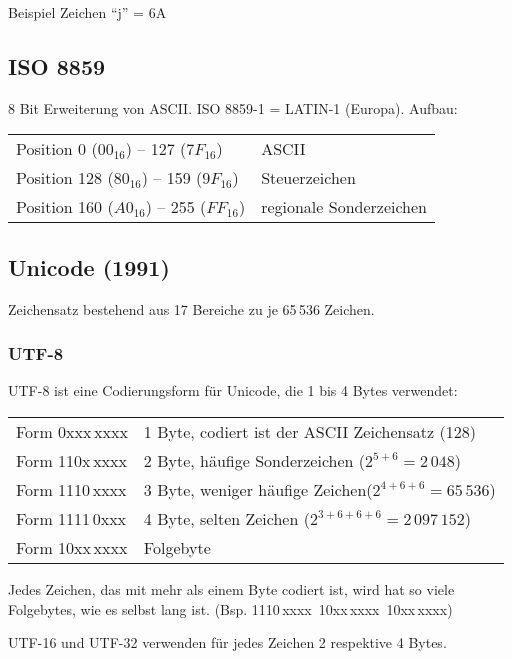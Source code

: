 Beispiel Zeichen \enquote{j} = 6A

\subsection{ISO 8859}
8 Bit Erweiterung von ASCII. ISO 8859-1 = LATIN-1 (Europa). Aufbau:
\begin{tabular}{@{}p{\the\MyLenA}%
				@{}p{\linewidth-\the\MyLenA}}
	Position 0 ($00_{16}$) -- 127 ($7F_{16}$) & ASCII\\
	Position 128 ($80_{16}$) -- 159 ($9F_{16}$) & Steuerzeichen\\
	Position 160 ($A0_{16}$) -- 255 ($FF_{16}$) & regionale Sonderzeichen\\
\end{tabular}

\subsection{Unicode (1991)}
Zeichensatz bestehend aus 17 Bereiche zu je 65\,536 Zeichen.

\subsubsection{UTF-8}
UTF-8 ist eine Codierungsform für Unicode, die 1 bis 4 Bytes verwendet:
\settowidth{\MyLenA}{Form 0xxx\,xxxx~~}
\begin{tabular}{@{}p{\the\MyLenA}%
				@{}p{\linewidth-\the\MyLenA}}
	Form 0xxx\,xxxx & 1 Byte, codiert ist der ASCII Zeichensatz (128)\\
	Form 110x\,xxxx & 2 Byte, häufige Sonderzeichen ($2^{5+6} = 2\,048$)\\
	Form 1110\,xxxx & 3 Byte, weniger häufige Zeichen($2^{4+6+6} = 65\,536$)\\
	Form 1111\,0xxx & 4 Byte, selten Zeichen ($2^{3+6+6+6} = 2\,097\,152$)\\
	Form 10xx\,xxxx & Folgebyte\\
\end{tabular}
Jedes Zeichen, das mit mehr als einem Byte codiert ist, wird hat so viele Folgebytes, wie es selbst lang ist. (Bsp. 1110\,xxxx~10xx\,xxxx~10xx\,xxxx)

UTF-16 und UTF-32 verwenden für jedes Zeichen 2 respektive 4 Bytes.